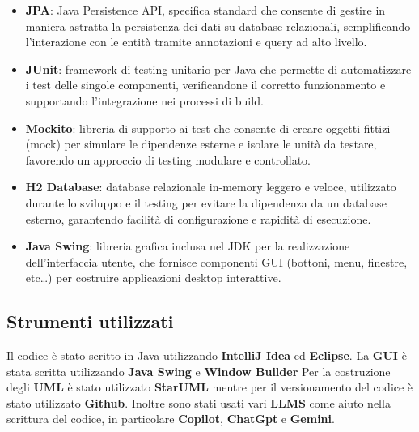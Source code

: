 \begin{itemize}
    \item \textbf{JPA}: Java Persistence API, specifica standard che consente di gestire in maniera astratta la 
    persistenza dei dati su database relazionali, semplificando l'interazione con le entità tramite annotazioni 
    e query ad alto livello.
    
    \item \textbf{JUnit}: framework di testing unitario per Java che permette di automatizzare i test delle singole
     componenti, verificandone il corretto funzionamento e supportando l'integrazione nei processi di build.
    
    \item \textbf{Mockito}: libreria di supporto ai test che consente di creare oggetti fittizi (mock) per simulare 
    le dipendenze esterne e isolare le unità da testare, favorendo un approccio di testing modulare e controllato.
    
    \item \textbf{H2 Database}: database relazionale in-memory leggero e veloce, utilizzato durante lo sviluppo e il 
    testing per evitare la dipendenza da un database esterno, garantendo facilità di configurazione e rapidità di esecuzione.
    
    \item \textbf{Java Swing}: libreria grafica inclusa nel JDK per la realizzazione dell'interfaccia utente, 
    che fornisce componenti GUI (bottoni, menu, finestre, etc\dots) per costruire applicazioni desktop interattive.

\end{itemize}

\subsection{Strumenti utilizzati}
Il codice è stato scritto in Java utilizzando \textbf{IntelliJ Idea} ed \textbf{Eclipse}.
La \textbf{GUI} è stata scritta utilizzando \textbf{Java Swing} e \textbf{Window Builder} 
Per la costruzione degli \textbf{UML} è stato utilizzato \textbf{StarUML} mentre per il versionamento
del codice è stato utilizzato \textbf{Github}. Inoltre sono stati usati vari \textbf{LLMS} come 
aiuto nella scrittura del codice, in particolare \textbf{Copilot}, \textbf{ChatGpt} e \textbf{Gemini}.